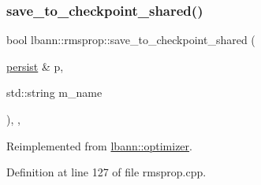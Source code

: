 \subsubsection{\texorpdfstring{save\+\_\+to\+\_\+checkpoint\+\_\+shared()}{save\_to\_checkpoint\_shared()}}
{\footnotesize\ttfamily bool lbann\+::rmsprop\+::save\+\_\+to\+\_\+checkpoint\+\_\+shared (\begin{DoxyParamCaption}\item[{\hyperlink{classlbann_1_1persist}{persist} \&}]{p,  }\item[{std\+::string}]{m\+\_\+name }\end{DoxyParamCaption})\hspace{0.3cm}{\ttfamily [override]}, {\ttfamily [private]}, {\ttfamily [virtual]}}



Reimplemented from \hyperlink{classlbann_1_1optimizer_afed10c6d8c5bd922f95075abeff711ce}{lbann\+::optimizer}.



Definition at line 127 of file rmsprop.\+cpp.


